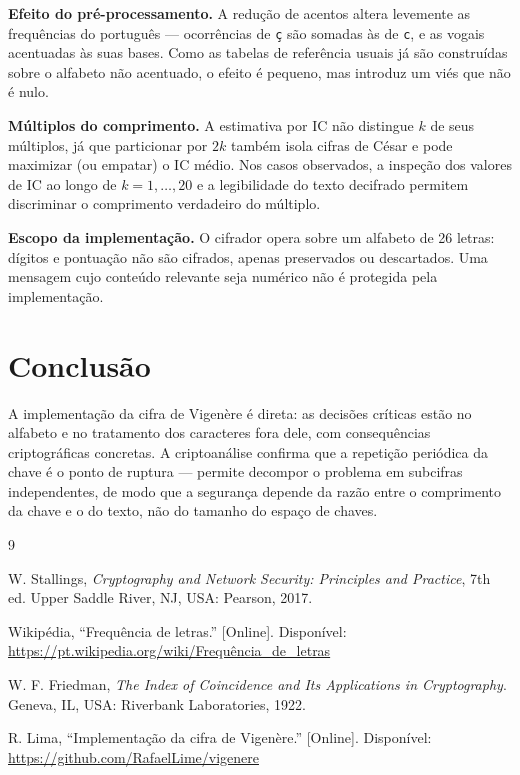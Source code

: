 \documentclass[conference]{IEEEtran}
\begin{document}
\textbf{Efeito do pré-processamento.} A redução de acentos altera levemente as
frequências do português --- ocorrências de \texttt{ç} são somadas às de
\texttt{c}, e as vogais acentuadas às suas bases. Como as tabelas de
referência usuais já são construídas sobre o alfabeto não acentuado, o efeito
é pequeno, mas introduz um viés que não é nulo.

\textbf{Múltiplos do comprimento.} A estimativa por IC não distingue $k$ de
seus múltiplos, já que particionar por $2k$ também isola cifras de César e
pode maximizar (ou empatar) o IC médio. Nos casos observados, a inspeção dos
valores de IC ao longo de $k = 1,\dots,20$ e a legibilidade do texto decifrado
permitem discriminar o comprimento verdadeiro do múltiplo.

\textbf{Escopo da implementação.} O cifrador opera sobre um alfabeto de 26
letras: dígitos e pontuação não são cifrados, apenas preservados ou
descartados. Uma mensagem cujo conteúdo relevante seja numérico não é
protegida pela implementação.

\section{Conclusão}
A implementação da cifra de Vigenère é direta: as decisões críticas estão no
alfabeto e no tratamento dos caracteres fora dele, com consequências
criptográficas concretas. A criptoanálise confirma que a repetição periódica
da chave é o ponto de ruptura --- permite decompor o problema em subcifras
independentes, de modo que a segurança depende da razão entre o comprimento
da chave e o do texto, não do tamanho do espaço de chaves.

\begin{thebibliography}{9}

W. Stallings, \textit{Cryptography and Network Security: Principles and
Practice}, 7th ed. Upper Saddle River, NJ, USA: Pearson, 2017.

Wikipédia, ``Frequência de letras.'' [Online]. Disponível:
\url{https://pt.wikipedia.org/wiki/Frequência_de_letras}

W. F. Friedman, \textit{The Index of Coincidence and Its Applications in
Cryptography}. Geneva, IL, USA: Riverbank Laboratories, 1922.

R. Lima, ``Implementação da cifra de Vigenère.'' [Online]. Disponível:
\url{https://github.com/RafaelLime/vigenere}

\end{thebibliography}
\end{document}
